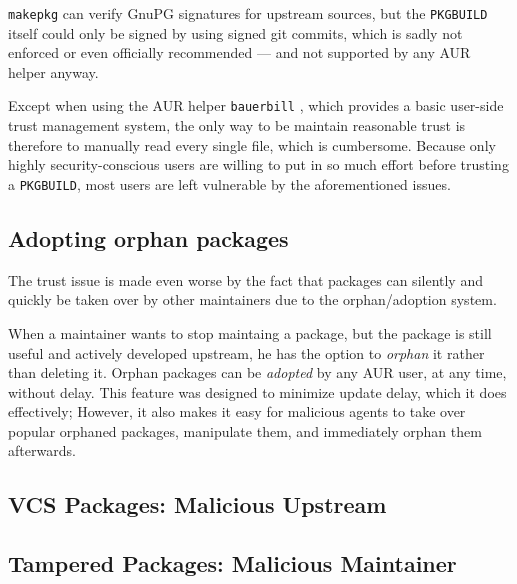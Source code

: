 \texttt{makepkg} can verify GnuPG signatures for upstream sources, but the \texttt{PKGBUILD} itself could only be signed by using signed git commits, which is sadly not enforced or even officially recommended --- and not supported by any AUR helper anyway.

Except when using the AUR helper \texttt{bauerbill} \cite{bauerbill}, which provides a basic user-side trust management system, the only way to be maintain reasonable trust is therefore to manually read every single file, which is cumbersome.
Because only highly security-conscious users are willing to put in so much effort before trusting a \texttt{PKGBUILD}, most users are left vulnerable by the aforementioned issues.

\subsection*{Adopting orphan packages}
The trust issue is made even worse by the fact that packages can silently and quickly be taken over by other maintainers due to the orphan/adoption system.

When a maintainer wants to stop maintaing a package, but the package is still useful and actively developed upstream, he has the option to \emph{orphan} it rather than deleting it.
Orphan packages can be \emph{adopted} by any AUR user, at any time, without delay.
This feature was designed to minimize update delay, which it does effectively; However, it also makes it easy for malicious agents to take over popular orphaned packages, manipulate them, and immediately orphan them afterwards.



\subsection*{VCS Packages: Malicious Upstream}
\cite{wiki:VCSPackages}

\subsection*{Tampered Packages: Malicious Maintainer}


